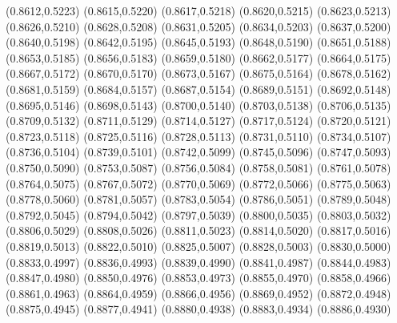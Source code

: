 \PST@Cross(0.8612,0.5223)
\PST@Cross(0.8615,0.5220)
\PST@Cross(0.8617,0.5218)
\PST@Cross(0.8620,0.5215)
\PST@Cross(0.8623,0.5213)
\PST@Cross(0.8626,0.5210)
\PST@Cross(0.8628,0.5208)
\PST@Cross(0.8631,0.5205)
\PST@Cross(0.8634,0.5203)
\PST@Cross(0.8637,0.5200)
\PST@Cross(0.8640,0.5198)
\PST@Cross(0.8642,0.5195)
\PST@Cross(0.8645,0.5193)
\PST@Cross(0.8648,0.5190)
\PST@Cross(0.8651,0.5188)
\PST@Cross(0.8653,0.5185)
\PST@Cross(0.8656,0.5183)
\PST@Cross(0.8659,0.5180)
\PST@Cross(0.8662,0.5177)
\PST@Cross(0.8664,0.5175)
\PST@Cross(0.8667,0.5172)
\PST@Cross(0.8670,0.5170)
\PST@Cross(0.8673,0.5167)
\PST@Cross(0.8675,0.5164)
\PST@Cross(0.8678,0.5162)
\PST@Cross(0.8681,0.5159)
\PST@Cross(0.8684,0.5157)
\PST@Cross(0.8687,0.5154)
\PST@Cross(0.8689,0.5151)
\PST@Cross(0.8692,0.5148)
\PST@Cross(0.8695,0.5146)
\PST@Cross(0.8698,0.5143)
\PST@Cross(0.8700,0.5140)
\PST@Cross(0.8703,0.5138)
\PST@Cross(0.8706,0.5135)
\PST@Cross(0.8709,0.5132)
\PST@Cross(0.8711,0.5129)
\PST@Cross(0.8714,0.5127)
\PST@Cross(0.8717,0.5124)
\PST@Cross(0.8720,0.5121)
\PST@Cross(0.8723,0.5118)
\PST@Cross(0.8725,0.5116)
\PST@Cross(0.8728,0.5113)
\PST@Cross(0.8731,0.5110)
\PST@Cross(0.8734,0.5107)
\PST@Cross(0.8736,0.5104)
\PST@Cross(0.8739,0.5101)
\PST@Cross(0.8742,0.5099)
\PST@Cross(0.8745,0.5096)
\PST@Cross(0.8747,0.5093)
\PST@Cross(0.8750,0.5090)
\PST@Cross(0.8753,0.5087)
\PST@Cross(0.8756,0.5084)
\PST@Cross(0.8758,0.5081)
\PST@Cross(0.8761,0.5078)
\PST@Cross(0.8764,0.5075)
\PST@Cross(0.8767,0.5072)
\PST@Cross(0.8770,0.5069)
\PST@Cross(0.8772,0.5066)
\PST@Cross(0.8775,0.5063)
\PST@Cross(0.8778,0.5060)
\PST@Cross(0.8781,0.5057)
\PST@Cross(0.8783,0.5054)
\PST@Cross(0.8786,0.5051)
\PST@Cross(0.8789,0.5048)
\PST@Cross(0.8792,0.5045)
\PST@Cross(0.8794,0.5042)
\PST@Cross(0.8797,0.5039)
\PST@Cross(0.8800,0.5035)
\PST@Cross(0.8803,0.5032)
\PST@Cross(0.8806,0.5029)
\PST@Cross(0.8808,0.5026)
\PST@Cross(0.8811,0.5023)
\PST@Cross(0.8814,0.5020)
\PST@Cross(0.8817,0.5016)
\PST@Cross(0.8819,0.5013)
\PST@Cross(0.8822,0.5010)
\PST@Cross(0.8825,0.5007)
\PST@Cross(0.8828,0.5003)
\PST@Cross(0.8830,0.5000)
\PST@Cross(0.8833,0.4997)
\PST@Cross(0.8836,0.4993)
\PST@Cross(0.8839,0.4990)
\PST@Cross(0.8841,0.4987)
\PST@Cross(0.8844,0.4983)
\PST@Cross(0.8847,0.4980)
\PST@Cross(0.8850,0.4976)
\PST@Cross(0.8853,0.4973)
\PST@Cross(0.8855,0.4970)
\PST@Cross(0.8858,0.4966)
\PST@Cross(0.8861,0.4963)
\PST@Cross(0.8864,0.4959)
\PST@Cross(0.8866,0.4956)
\PST@Cross(0.8869,0.4952)
\PST@Cross(0.8872,0.4948)
\PST@Cross(0.8875,0.4945)
\PST@Cross(0.8877,0.4941)
\PST@Cross(0.8880,0.4938)
\PST@Cross(0.8883,0.4934)
\PST@Cross(0.8886,0.4930)
